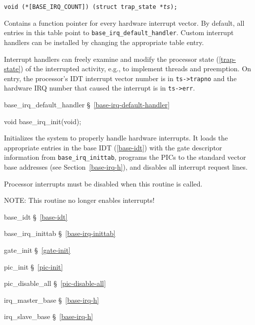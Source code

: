 \label{base-irq-handlers}
\begin{apisyn}

	{\tt void (*[BASE_IRQ_COUNT])
		(struct~trap_state *\emph{ts});}
\end{apisyn}
\begin{apidesc}
	Contains a function pointer for every hardware interrupt vector.
	By default, all entries in this table point to
	{\tt base_irq_default_handler}.
	Custom interrupt handlers can be installed by changing the appropriate
	table entry.

	Interrupt handlers can freely examine and modify the processor state
	(\ref{trap-state})
	of the interrupted activity, e.g., to implement threads and preemption.
	On entry, the processor's IDT interrupt vector number is in
	{\tt ts->trapno} and the hardware IRQ number that caused the
	interrupt is in {\tt ts->err}.
\end{apidesc}
\begin{apidep}
	\item[base_irq_default_handler]	\S~\ref{base-irq-default-handler}
\end{apidep}

\label{base-irq-init}
\begin{apisyn}

	\funcproto void base_irq_init(void);
\end{apisyn}
\begin{apidesc}
	Initializes the system to properly handle hardware interrupts.
	It loads the appropriate entries in the base IDT (\ref{base-idt})
	with the gate descriptor information from {\tt base_irq_inittab},
	programs the PICs to the standard vector base addresses
	(see Section~\ref{base-irq-h}), and disables all interrupt request
	lines.

	Processor interrupts must be disabled when this routine
	is called.

	NOTE: This routine no longer enables interrupts!
\end{apidesc}
\begin{apidep}
	\item[base_idt]		\S~\ref{base-idt}
	\item[base_irq_inittab]	\S~\ref{base-irq-inittab}
	\item[gate_init]	\S~\ref{gate-init}
	\item[pic_init]		\S~\ref{pic-init}
	\item[pic_disable_all]	\S~\ref{pic-disable-all}
	\item[irq_master_base]	\S~\ref{base-irq-h}
	\item[irq_slave_base]	\S~\ref{base-irq-h}
\end{apidep}

